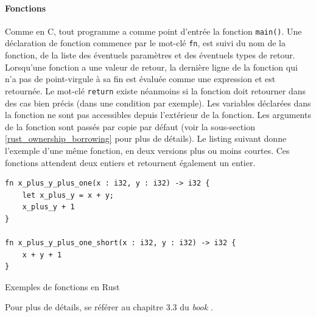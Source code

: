 \documentclass[a4paper, 12pt]{article}
\newenvironment{code}{\captionsetup{type=listing}}{}
\begin{document}
\paragraph{Fonctions}
Comme en C, tout programme a comme point d'entrée la fonction \texttt{main()}. Une 
déclaration de fonction commence par le mot-clé \texttt{fn}, est suivi du nom de la 
fonction, de la liste des éventuels paramètres et des éventuels types de retour. Lorsqu'une 
fonction a une valeur de retour, la dernière ligne de la fonction qui n'a pas de point-virgule 
à sa fin est évaluée comme une expression et est retournée. Le mot-clé \texttt{return} 
existe néanmoins si la fonction doit retourner dans des cas bien précis (dans une condition par 
exemple). Les variables déclarées dans la fonction ne sont pas accessibles depuis l'extérieur de la 
fonction. Les arguments de la fonction sont passés par copie par défaut (voir la sous-section 
\ref{rust_ownership_borrowing} pour plus de détails). Le listing suivant donne l'exemple d'une même 
fonction, en deux versions plus ou moins courtes. Ces fonctions attendent deux entiers et retournent 
également un entier.
\bigbreak
\begin{code}
    \begin{verbatim}
fn x_plus_y_plus_one(x : i32, y : i32) -> i32 {
    let x_plus_y = x + y;
    x_plus_y + 1
}

fn x_plus_y_plus_one_short(x : i32, y : i32) -> i32 {
    x + y + 1
}
    \end{verbatim}
    \caption{Exemples de fonctions en Rust}
    \label{rust_functions}
\end{code}
\bigbreak
Pour plus de détails, se référer au chapitre 3.3 du \textit{book} \cite{ref0}.
\end{document}

